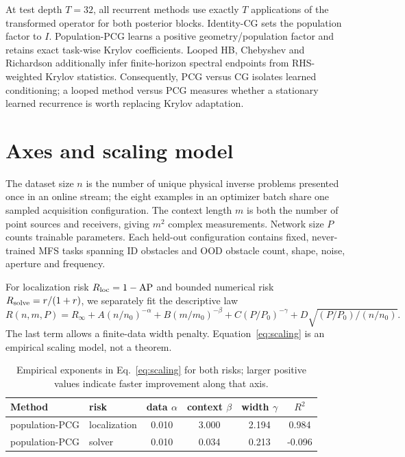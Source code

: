 \documentclass[10pt]{article}
\begin{document}
At test depth $T=32$, all recurrent methods use exactly
$T$ applications of the transformed operator for both posterior blocks.
Identity-CG sets the population factor to $I$.  Population-PCG learns a positive
geometry/population factor and retains exact task-wise Krylov coefficients.
Looped HB, Chebyshev and Richardson additionally infer finite-horizon spectral
endpoints from RHS-weighted Krylov statistics.  Consequently, PCG versus CG
isolates learned conditioning; a looped method versus PCG measures whether a
stationary learned recurrence is worth replacing Krylov adaptation.

\section{Axes and scaling model}
The dataset size $n$ is the number of unique physical inverse problems
presented once in an online stream; the eight examples in an optimizer batch
share one sampled acquisition configuration.  The context length $m$ is both
the number of point sources and receivers, giving $m^2$ complex measurements.
Network size $P$ counts trainable parameters.  Each held-out configuration
contains fixed, never-trained MFS tasks spanning ID obstacles and OOD obstacle
count, shape, noise, aperture and frequency.

For localization risk $R_{\rm loc}=1-\mathrm{AP}$ and bounded numerical
risk $R_{\rm solve}=r/(1+r)$, we separately fit the descriptive law
\begin{equation}
 R(n,m,P)=R_\infty+A(n/n_0)^{-\alpha}+B(m/m_0)^{-\beta}
 +C(P/P_0)^{-\gamma}+D\sqrt{(P/P_0)/(n/n_0)}.
 \label{eq:scaling}
\end{equation}
The last term allows a finite-data width penalty.  Equation~\eqref{eq:scaling}
is an empirical scaling model, not a theorem.

\begin{table}[t]
\centering\small
\caption{Empirical exponents in Eq.~\eqref{eq:scaling} for both risks;
larger positive values indicate faster improvement along that axis.}
\begin{tabular}{llcccc}
\toprule Method & risk & data $\alpha$ & context $\beta$ & width $\gamma$ & $R^2$\\
\midrule
population-PCG & localization & 0.010 & 3.000 & 2.194 & 0.984 \\
population-PCG & solver & 0.010 & 0.034 & 0.213 & -0.096 \\
\bottomrule
\end{tabular}
\end{table}
\end{document}
